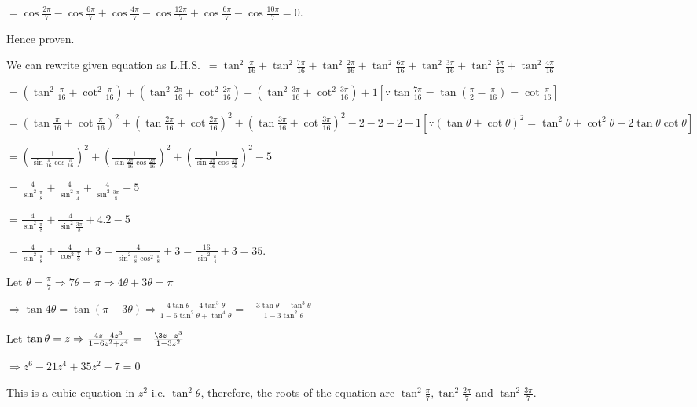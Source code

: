   $= \cos\frac{2\pi}{7} - \cos\frac{6\pi}{7} + \cos\frac{4\pi}{7} - \cos\frac{12\pi}{7} + \cos\frac{6\pi}{7}
  - \cos\frac{10\pi}{7} = 0$.

  Hence proven.
\item We can rewrite given equation as L.H.S.\ $= \tan^2\frac{\pi}{16} + \tan^2\frac{7\pi}{16}
  + \tan^2\frac{2\pi}{16} + \tan^2\frac{6\pi}{16} + \tan^2\frac{3\pi}{16} + \tan^2\frac{5\pi}{16}
  + \tan^2\frac{4\pi}{16}$

  $= \left(\tan^2\frac{\pi}{16} + \cot^2\frac{\pi}{16}\right) + \left(\tan^2\frac{2\pi}{16}
  + \cot^2\frac{2\pi}{16}\right) + \left(\tan^2\frac{3\pi}{16} + \cot^2\frac{3\pi}{16}\right) +
  1[\because \tan\frac{7\pi}{16} = \tan\left(\frac{\pi}{2} - \frac{\pi}{16}\right) = \cot\frac{\pi}{16}]$

  $= \left(\tan\frac{\pi}{16} + \cot\frac{\pi}{16}\right)^2 + \left(\tan\frac{2\pi}{16}
  + \cot\frac{2\pi}{16}\right)^2 + \left(\tan\frac{3\pi}{16} + \cot\frac{3\pi}{16}\right)^2 - 2 - 2 - 2 +
  1[\because (\tan\theta + \cot\theta)^2 = \tan^2\theta + \cot^2\theta - 2\tan\theta\cot\theta]$

  $= \left(\frac{1}{\sin\frac{\pi}{16}\cos\frac{\pi}{16}}\right)^2
  + \left(\frac{1}{\sin\frac{2\pi}{16}\cos\frac{2\pi}{16}}\right)^2
  + \left(\frac{1}{\sin\frac{3\pi}{16}\cos\frac{3\pi}{16}}\right)^2 - 5$

  $= \frac{4}{\sin^2\frac{\pi}{8}} + \frac{4}{\sin^2\frac{\pi}{4}} + \frac{4}{\sin^2\frac{3\pi}{8}} - 5$

  $= \frac{4}{\sin^2\frac{\pi}{8}} + \frac{4}{\sin^2\frac{3\pi}{8}} + 4.2 - 5$

  $= \frac{4}{\sin^2\frac{\pi}{8}} + \frac{4}{\cos^2\frac{\pi}{8}} + 3
  = \frac{4}{\sin^2\frac{\pi}{8}\cos^2\frac{\pi}{8}} + 3 = \frac{16}{\sin^2\frac{\pi}{4}} + 3 = 35$.
\item Let $\theta = \frac{\pi}{7} \Rightarrow 7\theta = \pi \Rightarrow 4\theta + 3\theta = \pi$

  $\Rightarrow \tan4\theta = \tan(\pi - 3\theta) \Rightarrow \frac{4\tan\theta - 4\tan^3\theta}{1 -
  6\tan^2\theta + \tan^4\theta} = -\frac{3\tan\theta - \tan^3\theta}{1 - 3\tan^2\theta}$

  Let $\tan\theta = z\Rightarrow \frac{4z - 4z^3}{1 - 6z^2 + z^4} = -\frac{\3z - z^3}{1 - 3z^2}$

  $\Rightarrow z^6 - 21z^4 + 35z^2 - 7 = 0$

  This is a cubic equation in $z^2$ i.e. $\tan^2\theta$, therefore, the roots of the equation are
  $\tan^2\frac{\pi}{7}, \tan^2\frac{2\pi}{7}$ and $\tan^2\frac{3\pi}{7}$.

